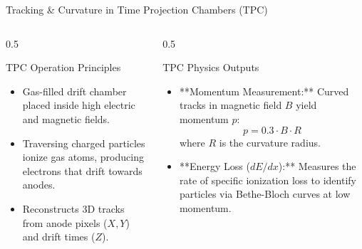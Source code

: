\documentclass[aspectratio=169]{beamer}
\begin{document}
\begin{frame}{Tracking \& Curvature in Time Projection Chambers (TPC)}
    \begin{columns}
        \begin{column}{0.5\textwidth}
            \begin{block}{TPC Operation Principles}
                \begin{itemize}
                    \item Gas-filled drift chamber placed inside high electric and magnetic fields.
                    \item Traversing charged particles ionize gas atoms, producing electrons that drift towards anodes.
                    \item Reconstructs 3D tracks from anode pixels ($X,Y$) and drift times ($Z$).
                \end{itemize}
            \end{block}
        \end{column}
        \begin{column}{0.5\textwidth}
            \begin{block}{TPC Physics Outputs}
                \begin{itemize}
                    \item **Momentum Measurement:** Curved tracks in magnetic field $B$ yield momentum $p$:
                    \[ p = 0.3 \cdot B \cdot R \]
                    where $R$ is the curvature radius.
                    \item **Energy Loss ($dE/dx$):** Measures the rate of specific ionization loss to identify particles via Bethe-Bloch curves at low momentum.
                \end{itemize}
            \end{block}
        \end{column}
    \end{columns}
\end{frame}
\end{document}
